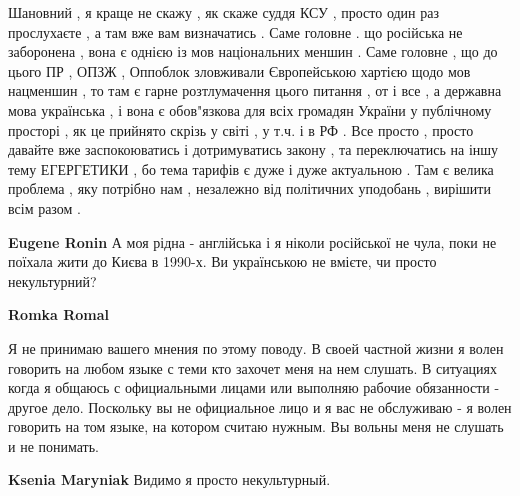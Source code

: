 \begin{itemize}
\begin{itemize}
Шановний , я краще не скажу , як скаже суддя КСУ , просто один раз прослухаєте
, а там вже вам визначатись . Саме головне . що російська не заборонена , вона
є однією із мов національних меншин . Саме головне , що до цього ПР , ОПЗЖ ,
Оппоблок зловживали Європейською хартією щодо мов нацменшин , то там є гарне
розтлумачення цього питання , от і все , а державна мова українська , і вона є
обов"язкова для всіх громадян України у публічному просторі , як це прийнято
скрізь у світі , у т.ч. і в РФ . Все просто , просто давайте вже заспокоюватись
і дотримуватись закону , та переключатись на іншу тему ЕГЕРГЕТИКИ , бо тема
тарифів є дуже і дуже актуальною . Там є велика проблема , яку потрібно нам ,
незалежно від політичних уподобань , вирішити всім разом .

 
\textbf{Eugene Ronin} А моя рідна - англійська і я ніколи російської не чула,
поки не поїхала жити до Києва в 1990-х. Ви українською не вмієте, чи просто
некультурний?

 
\textbf{Romka Romal} 

Я не принимаю вашего мнения по этому поводу. В своей частной жизни я волен
говорить на любом языке с теми кто захочет меня на нем слушать. В ситуациях
когда я общаюсь с официальными лицами или выполняю рабочие обязанности - другое
дело. Поскольку вы не официальное лицо и я вас не обслуживаю - я волен говорить
на том языке, на котором считаю нужным. Вы вольны меня не слушать и не
понимать.

 
\textbf{Ksenia Maryniak} Видимо я просто некультурный.

 

\end{itemize}
\end{itemize}
